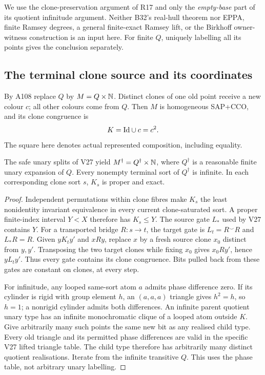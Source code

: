 We use the clone-preservation argument of R17 and only the \emph{empty-base}
part of its quotient infinitude argument. Neither B32's real-hull theorem nor
EPPA, finite Ramsey degrees, a general finite-exact Ramsey lift, or the
Birkhoff owner-witness construction is an input here. For finite $Q$, uniquely
labelling all its points gives the conclusion separately.

\subsection{The terminal clone source and its coordinates}

By A108 replace $Q$ by $M=Q\times\mathbb{N}$. Distinct clones of one old point
receive a new colour $c$; all other colours come from $Q$. Then $M$ is
homogeneous SAP+CCO, and its clone congruence is
\[
                       K=\mathrm{Id}\cup c=c^2.
\]
The square here denotes actual represented composition, including equality.

\begin{lemma}\label{lem:ramsey-clone-stability}
The safe unary splits of V27 yield
$M^\dagger=Q^\dagger\times\mathbb{N}$, where $Q^\dagger$ is a reasonable finite
unary expansion of $Q$. Every nonempty terminal sort of $Q^\dagger$ is
infinite. In each corresponding clone sort $s$, $K_s$ is proper and exact.
\end{lemma}
\begin{proof}
Independent permutations within clone fibres make $K_s$ the least
nonidentity invariant equivalence in every current clone-saturated sort. A
proper finite-index interval $Y<X$ therefore has $K_s\le Y$. The source gate
$L_*$ used by V27 contains $Y$. For a transported bridge $R:s\to t$, the
target gate is $L_t=R^\smile R$ and $L_*R=R$. Given $yK_ty'$ and $xRy$,
replace $x$ by a fresh source clone $x_0$ distinct from $y,y'$. Transposing the
two target clones while fixing $x_0$ gives $x_0Ry'$, hence $yL_ty'$.
Thus every gate contains its clone congruence. Bits pulled back from these
gates are constant on clones, at every step.

For infinitude, any looped same-sort atom $a$ admits phase difference zero.
If its cylinder is rigid with group element $h$, an $(a,a,a)$ triangle gives
$h^2=h$, so $h=1$; a nonrigid cylinder admits both differences. An infinite
parent quotient unary type has an infinite monochromatic clique of a looped
atom outside $K$. Give arbitrarily many such points the same new bit as any
realised child type. Every old triangle and its permitted phase differences
are valid in the specific V27 lifted triangle table. The child type therefore
has arbitrarily many distinct quotient realisations. Iterate from the infinite
transitive $Q$. This uses the phase table, not arbitrary unary labelling.
\end{proof}

